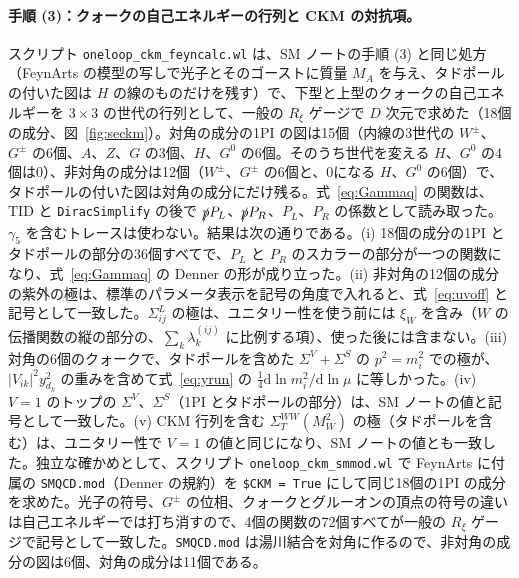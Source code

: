 \documentclass[a4paper,10pt]{ltjsarticle}
\newcommand{\dd}{\mathrm{d}}
\begin{document}
\paragraph{手順 (3)：クォークの自己エネルギーの行列と CKM の対抗項。}スクリプト \texttt{oneloop\_ckm\_feyncalc.wl} は、SM ノートの手順 (3) と同じ処方（FeynArts の模型の写しで光子とそのゴーストに質量 $M_A$ を与え、タドポールの付いた図は $H$ の線のものだけを残す）で、下型と上型のクォークの自己エネルギーを $3\times3$ の世代の行列として、一般の $R_\xi$ ゲージで $D$ 次元で求めた（18個の成分、図~\ref{fig:seckm}）。対角の成分の1PI の図は15個（内線の3世代の $W^\pm$、$G^\pm$ の6個、$A$、$Z$、$G$ の3個、$H$、$G^0$ の6個。そのうち世代を変える $H$、$G^0$ の4個は0）、非対角の成分は12個（$W^\pm$、$G^\pm$ の6個と、0になる $H$、$G^0$ の6個）で、タドポールの付いた図は対角の成分にだけ残る。式~\eqref{eq:Gammaq} の関数は、TID と \texttt{DiracSimplify} の後で $\slashed pP_L$、$\slashed pP_R$、$P_L$、$P_R$ の係数として読み取った。$\gamma_5$ を含むトレースは使わない。結果は次の通りである。(i) 18個の成分の1PI とタドポールの部分の36個すべてで、$P_L$ と $P_R$ のスカラーの部分が一つの関数になり、式~\eqref{eq:Gammaq} の Denner の形が成り立った。(ii) 非対角の12個の成分の紫外の極は、標準のパラメータ表示を記号の角度で入れると、式~\eqref{eq:uvoff} と記号として一致した。$\Sigma^L_{ij}$ の極は、ユニタリー性を使う前には $\xi_W$ を含み（$W$ の伝播関数の縦の部分の、$\sum_k\lambda^{(ij)}_k$ に比例する項）、使った後には含まない。(iii) 対角の6個のクォークで、タドポールを含めた $\Sigma^V+\Sigma^S$ の $p^2=m_i^2$ での極が、$|V_{ik}|^2y_{d_k}^2$ の重みを含めて式~\eqref{eq:yrun} の $\frac14\dd\ln m_i^2/\dd\ln\mu$ に等しかった。(iv) $V=1$ のトップの $\Sigma^V$、$\Sigma^S$（1PI とタドポールの部分）は、SM ノートの値と記号として一致した。(v) CKM 行列を含む $\Sigma^{WW}_T(M_W^2)$ の極（タドポールを含む）は、ユニタリー性で $V=1$ の値と同じになり、SM ノートの値とも一致した。独立な確かめとして、スクリプト \texttt{oneloop\_ckm\_smmod.wl} で FeynArts に付属の \texttt{SMQCD.mod}（Denner の規約）を \texttt{\$CKM = True} にして同じ18個の1PI の成分を求めた。光子の符号、$G^\pm$ の位相、クォークとグルーオンの頂点の符号の違いは自己エネルギーでは打ち消すので、4個の関数の72個すべてが一般の $R_\xi$ ゲージで記号として一致した。\texttt{SMQCD.mod} は湯川結合を対角に作るので、非対角の成分の図は6個、対角の成分は11個である。
\end{document}
